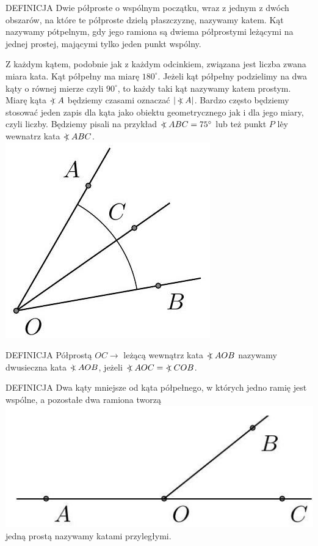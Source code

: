 \documentclass[10pt]{article}
\newcommand\Varangle{\mathop{{<\!\!\!\!\!\text{\small)}}\:}\nolimits}
\begin{document}
DEFINICJA Dwie półproste o wspólnym początku, wraz z jednym z dwóch obszarów, na które te półproste dzielą płaszczyznę, nazywamy katem. Kąt nazywamy pótpelnym, gdy jego ramiona są dwiema półprostymi leżącymi na jednej prostej, mającymi tylko jeden punkt wspólny.

Z każdym kątem, podobnie jak z każdym odcinkiem, związana jest liczba zwana miara kata. Kąt półpełny ma miarę \(180^{\circ}\). Jeżeli kąt półpełny podzielimy na dwa kąty o równej mierze czyli \(90^{\circ}\), to każdy taki kąt nazywamy katem prostym. Miarę kąta \(\Varangle A\) będziemy czasami oznaczać \(|\Varangle A|\). Bardzo często będziemy stosować jeden zapis dla kąta jako obiektu geometrycznego jak i dla jego miary, czyli liczby. Będziemy pisali na przykład \(\Varangle A B C=75^{\circ}\) lub też punkt \(P\) lė̇y wewnatrz kata \(\Varangle A B C\).\\
\includegraphics[max width=\textwidth, center]{2024_11_21_71f62bd117d375398909g-009(2)}

DEFINICJA Półprostą \(O C \rightarrow\) leżącą wewnątrz kata \(\Varangle A O B\) nazywamy dwusieczna kata \(\Varangle A O B\), jeżeli \(\Varangle A O C=\Varangle C O B\).

DEFINICJA Dwa kąty mniejsze od kąta półpełnego, w których jedno ramię jest wspólne, a pozostałe dwa ramiona tworzą\\
\includegraphics[max width=\textwidth, center]{2024_11_21_71f62bd117d375398909g-009}\\
jedną prostą nazywamy katami przyległymi.
\end{document}
